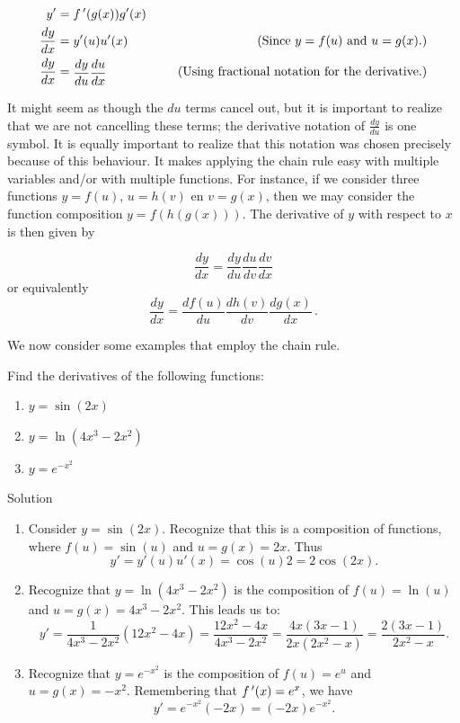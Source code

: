 \begin{align*}
y' &= \fp(g(x)) g'(x) \\
\frac{dy}{dx} &= \parbox{70pt}{$\ds y'(u)  u'(x)$} &\mbox{ (Since $y=f(u)$ and $u=g(x)$.)}\\
\frac{dy}{dx} &= \parbox{70pt}{$\ds \frac{dy}{du}  \frac{du}{dx}$ } &\mbox{ (Using fractional notation for the derivative.)}
\end{align*}

It might seem as though the $du$ terms cancel out, but it is important to realize that we are not cancelling these terms; the derivative notation of $\frac{dy}{du}$ is one symbol. It is equally important to realize that this notation was chosen precisely because of this behaviour. It makes applying the chain rule easy with multiple variables and/or with multiple functions. For instance, if we consider three functions  $y=f(u)$, $u=h(v)$ en $v=g(x)$, then we may consider the function composition $y=f(h(g(x)))$. The derivative of $y$ with respect to $x$ is then given by
 
$$\dfrac{dy}{dx}=\dfrac{dy}{du}\dfrac{du}{dv}\dfrac{dv}{dx}$$
or equivalently
$$\dfrac{dy}{dx}=\dfrac{df(u)}{du}\dfrac{dh(v)}{dv}\dfrac{dg(x)}{dx}\,.$$


We now consider some examples that employ the chain rule.

\ifcalculus
\begin{example}\label{ex_chain3}
Find the derivatives of the following functions:

		\begin{multicols}{3}
			\begin{enumerate}
			\item		$y = \sin{(2x)}$
			\item 	$y= \ln (4x^3-2x^2)$
   	\item	$y = e^{-x^2}$
	\end{enumerate}
	\end{multicols}


Solution 
\begin{enumerate}
		\item		Consider $y = \sin(2x)$. Recognize that this is a composition of functions, where $f(u) = \sin(u)$ and $u=g(x) = 2x$. Thus $$y' = y'(u) u'(x) = \cos (u) 2 = 2\cos(2x).$$
		
		\item		Recognize that $y = \ln (4x^3-2x^2)$ is the composition of $f(u) = \ln(u)$ and $u=g(x) = 4x^3-2x^2$. This leads us to:
		$$y' = \frac{1}{4x^3-2x^2}  (12x^2-4x) = \frac{12x^2-4x}{4x^3-2x^2}= \frac{4x(3x-1)}{2x(2x^2-x)} = \frac{2(3x-1)}{2x^2-x}.$$
		
		\item		Recognize  that $y = e^{-x^2}$ is the composition of $f(u) = e^u$ and $u=g(x) = -x^2$. Remembering that $f\,'(x) = e^x$, we have $$y' = e^{-x^2}(-2x) = (-2x)e^{-x^2}.$$
	\end{enumerate}
\end{example}

